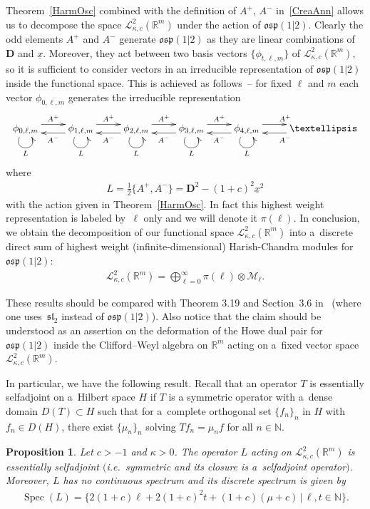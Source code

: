 \documentclass[11pt]{article}
\newtheorem{proposition}{Proposition}
\numberwithin{equation}{section}
\numberwithin{theorem}{section}
\numberwithin{proposition}{section}
\numberwithin{lemma}{section}
\numberwithin{corollary}{section}
\numberwithin{definition}{section}
\numberwithin{example}{section}
\numberwithin{remark}{section}
\numberwithin{note}{section}
\theoremstyle{remark}
\newcommand{\mR}{\mathbb{R}}
\newcommand{\mN}{\mathbb{N}}
\newcommand{\cM}{\mathcal{M}}
\newcommand{\cL}{\mathcal{L}}
\newcommand{\dD}{\textbf{D}}
\newcommand{\ux}{\underline{x}}
\def\k{{\kappa}}
\begin{document}
Theorem~\ref{HarmOsc} combined with the def\/inition of $A^{+}$, $A^{-}$ in~\eqref{CreaAnn} allows us to
decompose the space $\cL^{2}_{\k,c}(\mR^{m})$ under the action of $\mathfrak{osp}(1|2)$.
Clearly the odd elements $A^{+}$ and $A^{-}$ generate
$\mathfrak{osp}(1|2)$ as they are linear combinations of $\dD$ and $\ux$.
Moreover, they act between two basis vectors
$\{\phi_{t,\ell,m}\}$ of $\cL^{2}_{\k,c}(\mR^{m})$, so it is suf\/f\/icient to consider vectors in an
irreducible representation of $\mathfrak{osp}(1|2)$ inside the functional space.
This is achieved as follows~-- for f\/ixed $\ell$ and $m$ each vector $\phi_{0,\ell,m}$ generates the
irreducible representation
\begin{gather*}
\xymatrix{
\phi_{0,\ell,m}\ar@<1ex>[r]^{A^+}\ar@(dl,dr)_{L}&\phi_{1,\ell,m}\ar@(dl,dr)_{L}
\ar@<1ex>[r]^{A^+}\ar@<1ex>[l]^{A^-}&\phi_{2,\ell,m}\ar@(dl,dr)_{L}\ar@<1ex>[r]^{A^+}
\ar@<1ex>[l]^{A^-}&\phi_{3,\ell,m}\ar@(dl,dr)_{L}\ar@<1ex>[r]^{A^+}\ar@<1ex>[l]^{A^-}
&\phi_{4,\ell,m}\ar@(dl,dr)_{L}\ar@<1ex>[r]^{A^+}\ar@<1ex>[l]^{A^-}&\ar@<1ex>[l]^{A^-}\ldots
}
\end{gather*}
where
\begin{gather*}
L=\frac{1}{2}\{A^{+},A^{-}\}=\dD^{2}-(1+c)^{2}\ux^{2}
\end{gather*}
with the action given in Theorem~\ref{HarmOsc}.
In fact this highest weight representation is labeled by~$\ell$ only and we will denote it
$\pi(\ell)$.
In conclusion, we obtain the decomposition of our functional space $\cL^{2}_{\k,c}(\mR^{m})$
into a~discrete direct sum of highest weight (inf\/inite-dimensional)
Harish-Chandra modules for~$\mathfrak{osp}(1|2)$:
\begin{gather*}
\cL^{2}_{\k,c}(\mR^{m})=\bigoplus_{\ell=0}^{\infty}\pi(\ell)\otimes\cM_{\ell}.
\end{gather*}

These results should be compared with Theorem 3.19 and Section~3.6 in~\cite{Orsted2} (where one
uses~$\mathfrak{sl}_{2}$ instead of $\mathfrak{osp}(1|2)$).
Also notice that the claim should be understood as an assertion on the deformation of the Howe dual
pair for $\mathfrak{osp}(1|2)$ inside the Clif\/ford--Weyl algebra on $\mR^{m}$ acting on a~f\/ixed vector
space $\cL^{2}_{\k,c}(\mR^{m})$.

In particular, we have the following result.
Recall that an operator $T$ is essentially selfadjoint on a~Hilbert space $H$ if $T$ is a
symmetric operator with a~dense domain $D(T)\subset H$ such that for a~complete orthogonal set
$\{f_n\}_n$ in $H$ with $f_n\in D(H)$, there exist $\{\mu_n\}_n$ solving $Tf_n=\mu_nf$ for all
$n\in\mN$.
\begin{proposition}
Let $c>-1$ and $\kappa>0$.
The operator $L$ acting on
$\cL^{2}_{\k,c}(\mR^{m})$ is essentially selfadjoint $($i.e.\
symmetric and its closure is a~selfadjoint operator$)$.
Moreover, $L$ has no continuous spectrum and its
discrete spectrum is given by
\begin{gather*}
\operatorname{Spec}(L)=\{2(1+c)\ell+2(1+c)^{2}t+(1+c)(\mu+c)\,|\,\ell,t\in\mN\}.
\end{gather*}
\end{proposition}
\end{document}

